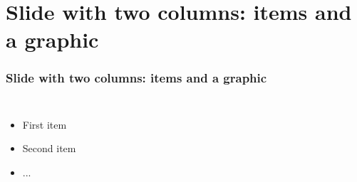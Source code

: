 \documentclass[]{beamer}
\begin{document}
\section{Slide with two columns: items and a graphic}

\begin{frame}
  \frametitle{Slide with two columns: items and a graphic}   %
  \begin{columns}[c]
  \column{2in}  %
  \begin{itemize}
  \item<1-> First item
  \item<2-> Second item
  \item<3-> ...
  \end{itemize}
  \column{2in}
  \end{columns}
\end{frame}
\end{document}

